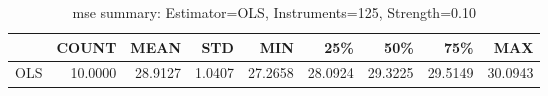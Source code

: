 \begin{table}[ht]
\centering
\caption{mse summary: Estimator=OLS, Instruments=125, Strength=0.10}
\begin{tabular}{lrrrrrrrr}
\toprule
 & COUNT & MEAN & STD & MIN & 25\% & 50\% & 75\% & MAX \\
\midrule
OLS & 10.0000 & 28.9127 & 1.0407 & 27.2658 & 28.0924 & 29.3225 & 29.5149 & 30.0943 \\
\bottomrule
\end{tabular}
\end{table}
